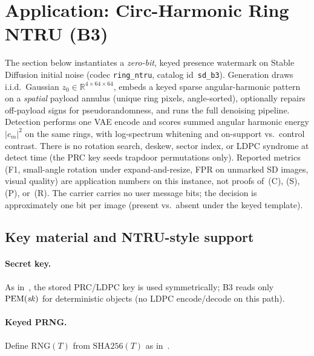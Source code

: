 \section{Application: Circ-Harmonic Ring NTRU (B3)}
\label{sec:app-b3}

The section below instantiates a \emph{zero-bit}, keyed presence watermark on
Stable Diffusion initial noise (codec \texttt{ring\_ntru}, catalog id~\texttt{sd\_b3}).
Generation draws i.i.d.\ Gaussian $z_0\in\mathbb{R}^{4\times64\times64}$, embeds a
keyed sparse angular-harmonic pattern on a \emph{spatial} payload annulus (unique
ring pixels, angle-sorted), optionally repairs off-payload signs for pseudorandomness,
and runs the full denoising pipeline.
Detection performs one VAE encode and scores summed angular harmonic energy
$|c_m|^2$ on the same rings, with log-spectrum whitening and on-support vs.\
control contrast.
There is no rotation search, deskew, sector index, or LDPC syndrome at detect time
(the PRC key seeds trapdoor permutations only).
Reported metrics (F1, small-angle rotation under expand-and-resize, FPR on unmarked
SD images, visual quality) are application numbers on this instance, not proofs
of~(C), (S), (P), or~(R).
The carrier carries no user message bits; the decision is approximately one bit
per image (present vs.\ absent under the keyed template).

\subsection{Key material and NTRU-style support}
\label{sec:b3-key}

\paragraph{Secret key.}
As in~, the stored PRC/LDPC key is used symmetrically;
B3 reads only $\mathrm{PEM}(\mathit{sk})$ for deterministic objects (no LDPC
encode/decode on this path).

\paragraph{Keyed PRNG.}
Define $\mathrm{RNG}(T)$ from $\mathrm{SHA256}(T)$ as in~.


